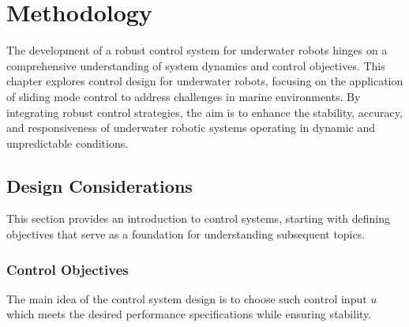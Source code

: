 \chapter{Methodology}
\label{chap:ctrl}




    The development of a robust control system for underwater robots hinges on a 
    comprehensive understanding of system dynamics and control objectives.
    This chapter explores control design for underwater robots, focusing on the application 
    of sliding mode control to address challenges in marine environments. By integrating 
    robust control strategies, the aim is to enhance the stability, accuracy, and 
    responsiveness of underwater robotic systems operating in dynamic and unpredictable conditions.

\section{Design Considerations}

    This section provides an introduction to control systems, starting with defining objectives 
    that serve as a foundation for understanding subsequent topics.

    \subsection{Control Objectives}

    The main idea of the control system design is to choose such control input $u$ which 
    meets the desired performance specifications while ensuring stability.

